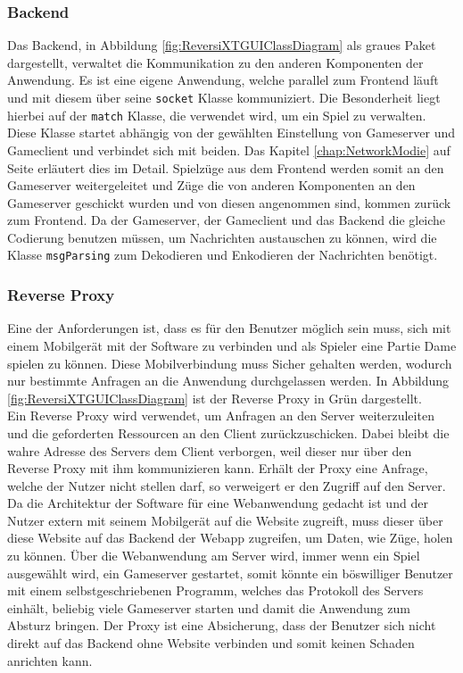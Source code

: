 \documentclass[12pt,a4paper,bibliography=totocnumbered,listof=totocnumbered]{article}
\begin{document}
\subsubsection{Backend}
Das Backend, in Abbildung \ref{fig:ReversiXTGUIClassDiagram} als graues Paket dargestellt, verwaltet die Kommunikation zu den anderen Komponenten der Anwendung.
Es ist eine eigene Anwendung, welche parallel zum Frontend läuft und mit diesem über seine \texttt{socket} Klasse kommuniziert.
Die Besonderheit liegt hierbei auf der \texttt{match} Klasse, die verwendet wird, um ein Spiel zu verwalten. 
Diese Klasse startet abhängig von der gewählten Einstellung von Gameserver und Gameclient und verbindet sich mit beiden. Das Kapitel \ref{chap:NetworkModie} auf 
Seite \pageref{chap:NetworkModie} erläutert dies im Detail. Spielzüge aus dem Frontend werden somit 
an den Gameserver weitergeleitet und Züge die von anderen Komponenten an den Gameserver geschickt wurden und von diesen angenommen sind, kommen zurück zum Frontend.
Da der Gameserver, der Gameclient und das Backend die gleiche Codierung benutzen müssen, um Nachrichten austauschen zu können, wird 
die Klasse \texttt{msgParsing} zum Dekodieren und Enkodieren der Nachrichten benötigt.

\subsubsection{Reverse Proxy}
Eine der Anforderungen ist, dass es für den Benutzer möglich sein muss, sich mit einem Mobilgerät mit der Software zu verbinden und als Spieler eine
Partie Dame spielen zu können. Diese Mobilverbindung muss Sicher gehalten werden, wodurch nur bestimmte Anfragen an die Anwendung durchgelassen werden.
In Abbildung \ref{fig:ReversiXTGUIClassDiagram} ist der Reverse Proxy in Grün dargestellt.
\\ 
Ein Reverse Proxy wird verwendet, um Anfragen an den Server weiterzuleiten und die geforderten Ressourcen an den Client zurückzuschicken. Dabei 
bleibt die wahre Adresse des Servers dem Client verborgen, weil dieser nur über den Reverse Proxy mit ihm kommunizieren kann.
Erhält der Proxy eine Anfrage, welche der Nutzer nicht stellen darf, so verweigert er den Zugriff auf den Server.
\\
Da die Architektur der Software für eine Webanwendung gedacht ist und der Nutzer extern mit seinem Mobilgerät auf die Website zugreift, 
muss dieser über diese Website auf das Backend der Webapp zugreifen, um Daten, wie Züge, holen zu können.
Über die Webanwendung am Server wird, immer wenn ein Spiel ausgewählt wird, ein Gameserver gestartet, somit könnte ein böswilliger Benutzer
mit einem selbstgeschriebenen Programm, welches das Protokoll des Servers einhält, beliebig viele Gameserver starten und damit die 
Anwendung zum Absturz bringen.
Der Proxy ist eine Absicherung, dass der Benutzer sich nicht direkt auf das Backend ohne Website verbinden und somit 
keinen Schaden anrichten kann. 
\end{document}
